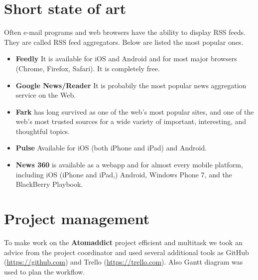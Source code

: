 \documentclass[12pt]{article}
\begin{document}
\section{Short state of art}

Often e-mail programs and web browsers have the ability to display RSS feeds. They are called RSS feed aggregators. Below are listed the most popular ones.~\cite{wiki:stateofart}

\begin{itemize}
	\item \textbf{Feedly}
	It is available for iOS and Android and for most major browsers (Chrome, Firefox, Safari). It is completely free.
	
	\item \textbf{Google News/Reader}
	It is probabily the most popular news aggregation service on the Web.
	
	\item \textbf{Fark} has long survived as one of the web's most popular sites, and one of the web's most trusted sources for a wide variety of important, interesting, and thoughtful topics.
	
	\item \textbf{Pulse}
	Available for iOS (both iPhone and iPad) and Android.
	
	\item \textbf{News 360} is available as a webapp and for almost every mobile platform, including iOS (iPhone and iPad,) Android, Windows Phone 7, and the BlackBerry Playbook.
	
	
\end{itemize}




\section{Project management}\label{project management}
To make work on the \textbf{Atomaddict} project efficient and multitask we took an advice from the project coordinator and used several additional tools as GitHub (\url{https://github.com}) and Trello (\url{https://trello.com}). Also Gantt diagram was used to plan the workflow.


\end{document}
